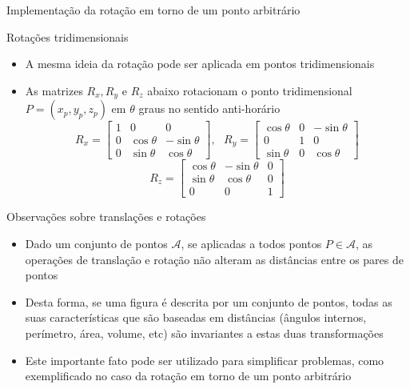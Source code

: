 \begin{frame}[fragile]{Implementação da rotação em torno de um ponto arbitrário}
\end{frame}


\begin{frame}[fragile]{Rotações tridimensionais}

    \begin{itemize}
        \item A mesma ideia da rotação pode ser aplicada em pontos tridimensionais
        \pause

        \item As matrizes $R_x, R_y$ e $R_z$ abaixo rotacionam o ponto tridimensional 
            $P = (x_p, y_p, z_p)$ em $\theta$ graus no sentido anti-horário
        \[
            R_x = \begin{bmatrix} 1 & 0 & 0 \\ 0 & \cos \theta & -\sin \theta \\
                0 & \sin \theta & \cos \theta \end{bmatrix}, \, \, \, \,
            R_y = \begin{bmatrix} \cos \theta & 0 & -\sin \theta \\ 0 & 1 & 0 \\
                \sin \theta & 0 & \cos \theta \end{bmatrix}
        \]
        \[
            R_z = \begin{bmatrix} \cos \theta & -\sin \theta & 0 \\
                \sin \theta & \cos \theta & 0 \\ 0 & 0 & 1\end{bmatrix}
        \]
    \end{itemize}

\end{frame}

\begin{frame}[fragile]{Observações sobre translações e rotações}

    \begin{itemize}
        \item Dado um conjunto de pontos $\mathcal{A}$, se aplicadas a todos pontos $P\in \mathcal{A}$, as operações de 
        translação e rotação não alteram as distâncias entre os pares de pontos
        \pause

        \item Desta forma, se uma figura é descrita por um conjunto de pontos, todas as suas 
            características que são baseadas em distâncias (ângulos internos, perímetro, área, 
            volume, etc) são invariantes a estas duas transformações
        \pause

        \item Este importante fato pode ser utilizado para simplificar problemas, 
            como exemplificado no caso da rotação em torno de um ponto arbitrário
    \end{itemize}

\end{frame}

